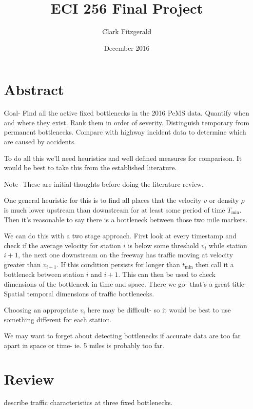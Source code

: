 \documentclass[12pt]{article}
\begin{document}
\title{ECI 256 Final Project}
\date{December 2016}
\author{Clark Fitzgerald}
\maketitle

\section{Abstract}

Goal- Find all the active fixed bottlenecks in the 2016 PeMS data. Quantify
when and where they exist. Rank them in order of severity. Distinguish
temporary from permanent bottlenecks. Compare with highway incident data to
determine which are caused by accidents. 

To do all this we'll need heuristics and well defined measures for
comparison. It would be best to take this from the established literature.

Note- These are initial thoughts before doing the literature review.

One general heuristic for this is to find all places that the velocity $v$ or
density $\rho$ is much lower upstream than downstream for at least some
period of time $T_{\min}$. Then it's reasonable to say there is a
bottleneck between those two mile markers.

We can do this with a two stage approach. First look at every timestamp and
check if the average velocity for station $i$ is below some threshold
$v_{i}$ while station $i + 1$, the next one downstream on the freeway has
traffic moving at velocity greater than $v_{i + 1}$. If this condition persists for
longer than $t_{\min}$ then call it a bottleneck between station $i$ and $i
+ 1$. This can then be used to check dimensions of the bottleneck in time
and space. There we go- that's a great title- Spatial temporal dimensions
of traffic bottlenecks.

Choosing an appropriate $v_i$ here may be difficult- so it would be best to
use something different for each station. 

We may want to forget about detecting bottlenecks if accurate data
are too far apart in space or time- ie. 5 miles is probably too far.

\section{Review}

\cite{chung2007relation} describe traffic characteristics at three fixed bottlenecks.
\end{document}
